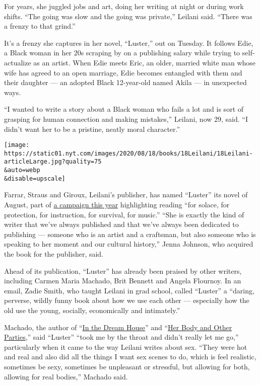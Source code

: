 For years, she juggled jobs and art, doing her writing at night or
during work shifts. ``The going was slow and the going was private,''
Leilani said. ``There was a frenzy to that grind.''

It's a frenzy she captures in her novel, ``Luster,'' out on Tuesday. It
follows Edie, a Black woman in her 20s scraping by on a publishing
salary while trying to self-actualize as an artist. When Edie meets
Eric, an older, married white man whose wife has agreed to an open
marriage, Edie becomes entangled with them and their daughter --- an
adopted Black 12-year-old named Akila --- in unexpected ways.

``I wanted to write a story about a Black woman who fails a lot and is
sort of grasping for human connection and making mistakes,'' Leilani,
now 29, said. ``I didn't want her to be a pristine, neatly moral
character.''

\texttt{[image: https://static01.nyt.com/images/2020/08/18/books/18Leilani/18Leilani-articleLarge.jpg?quality=75\\\&auto=webp\\\&disable=upscale]}

Farrar, Straus and Giroux, Leilani's publisher, has named ``Luster'' its
novel of August, part of \href{https://fsg2020.com/}{a campaign this
year} highlighting reading ``for solace, for protection, for
instruction, for survival, for music.'' ``She is exactly the kind of
writer that we've always published and that we've always been dedicated
to publishing --- someone who is an artist and a craftsman, but also
someone who is speaking to her moment and our cultural history,'' Jenna
Johnson, who acquired the book for the publisher, said.

Ahead of its publication, ``Luster'' has already been praised by other
writers, including Carmen Maria Machado, Brit Bennett and Angela
Flournoy. In an email, Zadie Smith, who taught Leilani in grad school,
called ``Luster'' a ``daring, perverse, wildly funny book about how we
use each other --- especially how the old use the young, socially,
economically and intimately.''

Machado, the author of
``\href{https://www.nytimes.com/2019/10/29/books/in-dream-house-memoir-carmen-maria-machado.html}{In
the Dream House}'' and
``\href{https://www.nytimes.com/2017/10/04/books/review-her-body-and-other-parties-carmen-maria-machado.html}{Her
Body and Other Parties},'' said ``Luster'' ``took me by the throat and
didn't really let me go,'' particularly when it came to the way Leilani
writes about sex. ``They were hot and real and also did all the things I
want sex scenes to do, which is feel realistic, sometimes be sexy,
sometimes be unpleasant or stressful, but allowing for both, allowing
for real bodies,'' Machado said.

